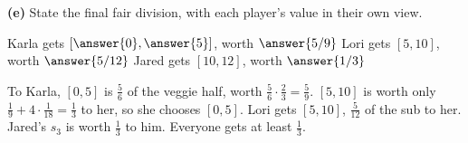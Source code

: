 \documentclass[12pt]{ximera}
\begin{document}
\begin{problem}
\begin{prompt}
\textbf{(e)} State the final fair division, with each player's value in their own view.

Karla gets $[\answer{0},\answer{5}]$, worth $\answer{5/9}$ \quad
Lori gets $[5,10]$, worth $\answer{5/12}$ \quad Jared gets $[10,12]$, worth $\answer{1/3}$
\begin{feedback}
To Karla, $[0,5]$ is $\frac56$ of the veggie half, worth $\frac56\cdot\frac23=\frac59$.
$[5,10]$ is worth only $\frac19+4\cdot\frac1{18}=\frac13$ to her, so she
chooses $[0,5]$. Lori gets $[5,10]$, $\frac5{12}$ of the sub to her. Jared's $s_3$ is
worth $\frac13$ to him. Everyone gets at least $\frac13$.
\end{feedback}
\end{prompt}
\end{problem}
\end{document}
